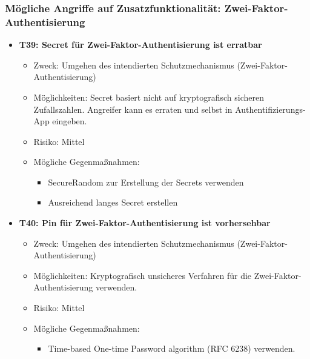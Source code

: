 \documentclass[12pt,DIV14,BCOR10mm,a4paper,parskip=half-,headsepline,headinclude,english,ngerman,bibliography=totocnumbered]{scrreprt}
\begin{document}
\subsubsection{Mögliche Angriffe auf Zusatzfunktionalität: Zwei-Faktor-Authentisierung}
\begin{itemize}

  \hypertarget{threat39}{}
  \item \textbf{T39: Secret für Zwei-Faktor-Authentisierung ist erratbar}
  \begin{itemize}
    \item Zweck: Umgehen des intendierten Schutzmechanismus (Zwei-Faktor-Authentisierung)
    \item Möglichkeiten: Secret basiert nicht auf kryptografisch sicheren Zufallszahlen. Angreifer kann es erraten und selbst in Authentifizierungs-App eingeben. 
    \item Risiko: Mittel
    \item Mögliche Gegenmaßnahmen:
      \begin{itemize}
      \item SecureRandom zur Erstellung der Secrets verwenden
      \item Ausreichend langes Secret erstellen
      \end{itemize}
  \end{itemize}
  
  \hypertarget{threat40}{}
  \item \textbf{T40: Pin für Zwei-Faktor-Authentisierung ist vorhersehbar}
  \begin{itemize}
    \item Zweck: Umgehen des intendierten Schutzmechanismus (Zwei-Faktor-Authentisierung)
    \item Möglichkeiten: Kryptografisch unsicheres Verfahren für die Zwei-Faktor-Authentisierung verwenden.
    \item Risiko: Mittel
    \item Mögliche Gegenmaßnahmen:
      \begin{itemize}
      	\item Time-based One-time Password algorithm (RFC 6238) verwenden.
      \end{itemize}
  \end{itemize}
    

\end{itemize}
\end{document}
